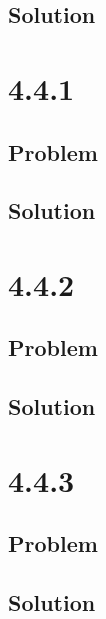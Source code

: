\documentclass[12pt]{article}
\begin{document}
\subsection{Solution}

\newpage
\section{4.4.1}

\subsection{Problem}

\subsection{Solution}

\newpage
\section{4.4.2}

\subsection{Problem}

\subsection{Solution}

\newpage
\section{4.4.3}

\subsection{Problem}

\subsection{Solution}

\newpage


\nocite{El-Deeb_PEU-356_Assignments}
\end{document}
